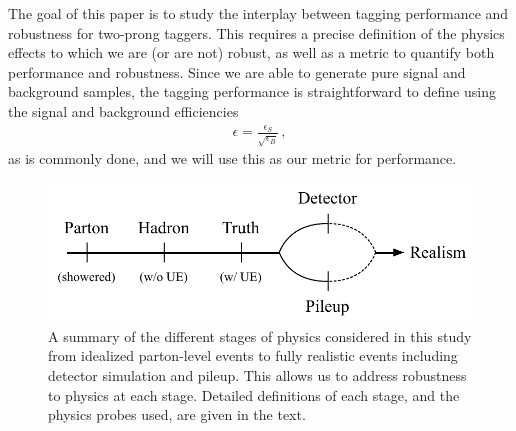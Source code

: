 \documentclass[11pt,letterpaper]{article}
\begin{document}
The goal of this paper is to study the interplay between tagging performance and robustness for two-prong taggers.
%
This requires a precise definition of the physics effects to which we are (or are not) robust, as well as a metric to quantify both performance and robustness.
%
Since we are able to generate pure signal and background samples, the tagging performance is straightforward to define using the signal and background efficiencies 
\begin{align}
\epsilon=\frac{\epsilon_S}{\sqrt{\epsilon_B}}\,,
\end{align}
as is commonly done, and we will use this as our metric for performance.

\begin{figure}[t]
\begin{center}
\includegraphics[width=0.75\columnwidth]{figures/realism_levels}
\end{center}
\caption{A summary of the different stages of physics considered in
  this study from idealized parton-level events to fully realistic
  events including detector simulation and pileup.
  This allows us to
  address robustness to physics at each stage.
  Detailed definitions of
  each stage, and the physics probes used, are given in the text.
   }
\label{fig:realism}
\end{figure}
\end{document}
